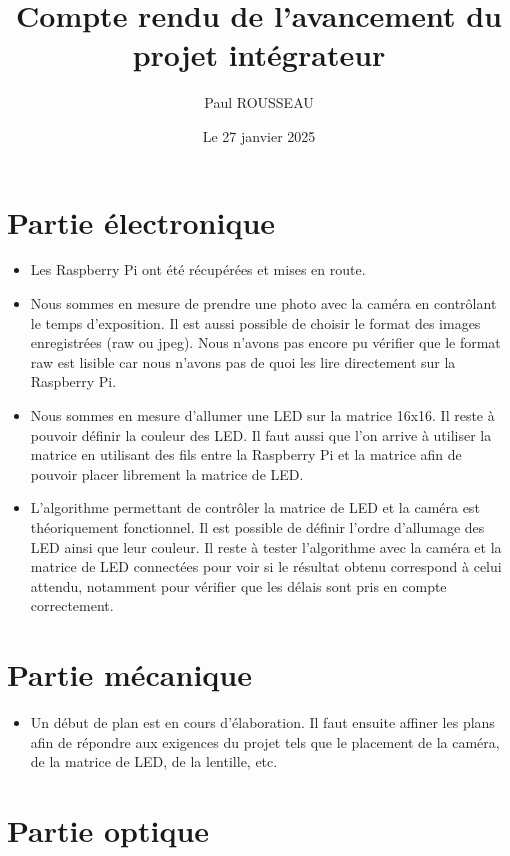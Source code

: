\documentclass[12pt, a4paper]{article}
\title{Compte rendu de l'avancement du projet intégrateur}
\author{Paul ROUSSEAU}
\date{Le 27 janvier 2025}
\begin{document}
\maketitle

\section{Partie électronique}

\begin{itemize}
	\item Les Raspberry Pi ont été récupérées et mises en route.
	\item Nous sommes en mesure de prendre une photo avec la caméra en contrôlant le temps d'exposition. Il est aussi possible de choisir le format des images enregistrées (raw ou jpeg). Nous n'avons pas encore pu vérifier que le format raw est lisible car nous n'avons pas de quoi les lire directement sur la Raspberry Pi.
	\item Nous sommes en mesure d'allumer une LED sur la matrice 16x16. Il reste à pouvoir définir la couleur des LED. Il faut aussi que l'on arrive à utiliser la matrice en utilisant des fils entre la Raspberry Pi et la matrice afin de pouvoir placer librement la matrice de LED.
	\item L'algorithme permettant de contrôler la matrice de LED et la caméra est théoriquement fonctionnel. Il est possible de définir l'ordre d'allumage des LED ainsi que leur couleur. Il reste à tester l'algorithme avec la caméra et la matrice de LED connectées pour voir si le résultat obtenu correspond à celui attendu, notamment pour vérifier que les délais sont pris en compte correctement.
\end{itemize}

\section{Partie mécanique}

\begin{itemize}
	\item Un début de plan est en cours d'élaboration. Il faut ensuite affiner les plans afin de répondre aux exigences du projet tels que le placement de la caméra, de la matrice de LED, de la lentille, etc.
\end{itemize}

\section{Partie optique}
\end{document}
